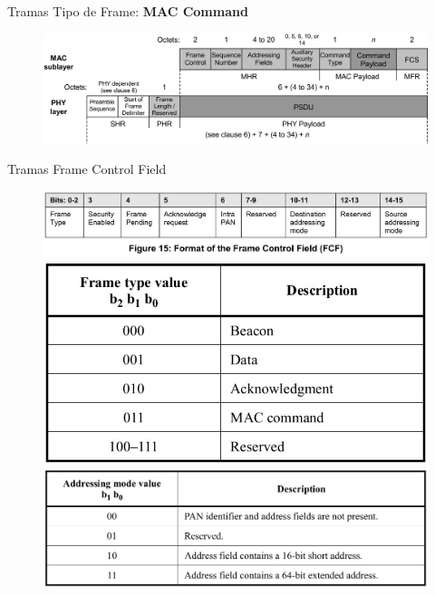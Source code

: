 \documentclass[aspectratio=169]{beamer}
\begin{document}
\begin{frame}[t]{Tramas}
Tipo de Frame: \textbf{MAC Command}
\vspace{10px}
	\begin{figure}[H]
		\includegraphics[width=1\textwidth]{./imagenes/maccommand.jpg}
	\end{figure}	  	  	
\end{frame}


\begin{frame}[t]{Tramas}
Frame Control Field
	\begin{figure}[H]
	\centering
		\includegraphics[height=.3\textheight]{./imagenes/FCF.jpg}\\
		\vspace{20px}
		\includegraphics[height=.3\textheight]{./imagenes/frametype.jpg}
		\hspace{20px} 
		\includegraphics[height=.3\textheight]{./imagenes/addressingmode.jpg}
	\end{figure} 	
\end{frame}
\end{document}
